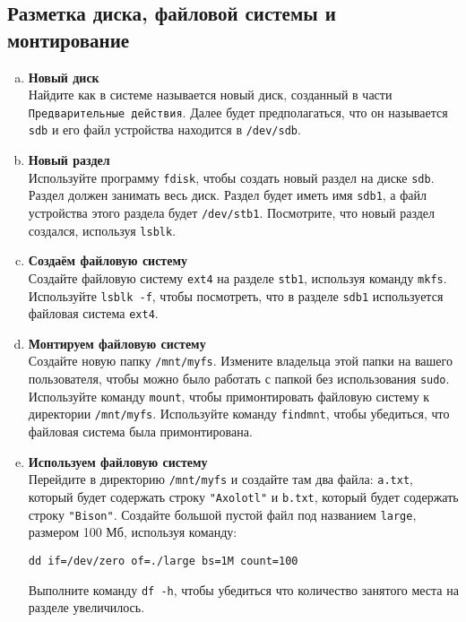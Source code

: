 \documentclass{article}
\begin{document}
\subsection{Разметка диска, файловой системы и монтирование}
\begin{enumerate}[a.]
\item \textbf{Новый диск}\\
Найдите как в системе называется новый диск, созданный в части \texttt{Предварительные действия}. Далее будет предполагаться, что он называется \texttt{sdb} и его файл устройства находится в \texttt{/dev/sdb}.

\item \textbf{Новый раздел}\\
Используйте программу \texttt{fdisk}, чтобы создать новый раздел на диске \texttt{sdb}. Раздел должен занимать весь диск. Раздел будет иметь имя \texttt{sdb1}, а файл устройства этого раздела будет \texttt{/dev/stb1}. Посмотрите, что новый раздел создался, используя \texttt{lsblk}.

\item \textbf{Создаём файловую систему}\\
Создайте файловую систему \texttt{ext4} на разделе \texttt{stb1}, используя команду \texttt{mkfs}. Используйте \texttt{lsblk -f}, чтобы посмотреть, что в разделе \texttt{sdb1} используется файловая система \texttt{ext4}.

\item \textbf{Монтируем файловую систему}\\
Создайте новую папку \texttt{/mnt/myfs}. Измените владельца этой папки на вашего пользователя, чтобы можно было работать с папкой без использования \texttt{sudo}. Используйте команду \texttt{mount}, чтобы примонтировать файловую систему к директории \texttt{/mnt/myfs}. Используйте команду \texttt{findmnt}, чтобы убедиться, что файловая система была примонтирована.

\item \textbf{Используем файловую систему}\\
Перейдите в директорию \texttt{/mnt/myfs} и создайте там два файла: \texttt{a.txt}, который будет содержать строку \texttt{"Axolotl"} и \texttt{b.txt}, который будет содержать строку \texttt{"Bison"}. Создайте большой пустой файл под названием \texttt{large}, размером 100 Мб, используя команду:
\begin{lstlisting}
dd if=/dev/zero of=./large bs=1M count=100
\end{lstlisting}
Выполните команду \texttt{df -h}, чтобы убедиться что количество занятого места на разделе увеличилось.


\end{enumerate}
\end{document}
